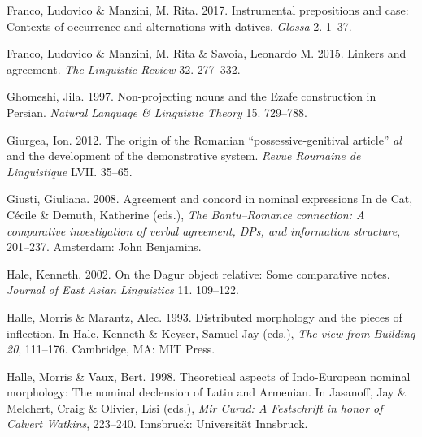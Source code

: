 \documentclass[output=paper]{langsci/langscibook}
\begin{document}
\begin{styleSfondomedioiColorexxi}
Franco, Ludovico \& Manzini, M. Rita. 2017. Instrumental prepositions and case: Contexts of occurrence and alternations with datives. \textit{Glossa} 2. 1–37.
\end{styleSfondomedioiColorexxi}

\begin{styleSfondomedioiColorexi}
Franco, Ludovico \& Manzini, M. Rita \& Savoia, Leonardo M. 2015. Linkers and agreement. \textit{The Linguistic Review} 32. 277–332.
\end{styleSfondomedioiColorexi}

\begin{styleSfondomedioiColorexxi}
Ghomeshi, Jila. 1997. Non-projecting nouns and the Ezafe construction in Persian. \textit{Natural} \textit{Language \& Linguistic Theory} 15. 729–788.
\end{styleSfondomedioiColorexxi}

\begin{styleSfondomedioiColorexi}
Giurgea, Ion. 2012. The origin of the Romanian “possessive-genitival article” \textit{al} and the development of the demonstrative system. \textit{Revue Roumaine de Linguistique} LVII. 35–65.
\end{styleSfondomedioiColorexi}

\begin{styleSfondomedioiColorexi}
Giusti, Giuliana. 2008. Agreement and concord in nominal expressions In de Cat, Cécile \& Demuth, Katherine (eds.), \textit{The Bantu–Romance connection: A comparative investigation of verbal agreement, DPs, and information structure}, 201–237. Amsterdam: John Benjamins.
\end{styleSfondomedioiColorexi}

\begin{styleSfondomedioiColorexi}
Hale, Kenneth. 2002. On the Dagur object relative: Some comparative notes. \textit{Journal of East Asian Linguistics} 11. 109–122.
\end{styleSfondomedioiColorexi}

\begin{styleSfondomedioiColorexi}
Halle, Morris \& Marantz, Alec. 1993. Distributed morphology and the pieces of inflection. In Hale, Kenneth \& Keyser, Samuel Jay (eds.), \textit{The view from Building 20}, 111–176. Cambridge, MA: MIT Press. 
\end{styleSfondomedioiColorexi}

\begin{styleSfondomedioiColorexi}
Halle, Morris \& Vaux, Bert. 1998. Theoretical aspects of Indo-European nominal morphology: The nominal declension of Latin and Armenian. In Jasanoff, Jay \& Melchert, Craig \& Olivier, Lisi (eds.), \textit{Mir Curad: A Festschrift in honor of Calvert Watkins}, 223–240. Innsbruck: Universität Innsbruck.
\end{styleSfondomedioiColorexi}
\end{document}

